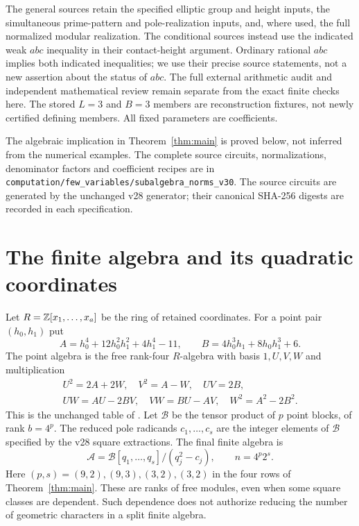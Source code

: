 \documentclass[11pt,a4paper]{article}
\theoremstyle{remark}\newtheorem{remark}[theorem]{Remark}
\begin{document}
The general sources retain the specified elliptic group and height inputs,
the simultaneous prime-pattern and pole-realization inputs, and, where
used, the full normalized modular realization. The conditional sources
instead use the indicated weak $abc$ inequality in their contact-height
argument. Ordinary rational $abc$ implies both indicated inequalities;
we use their precise source statements, not a new assertion about the
status of $abc$. The full external arithmetic audit and independent
mathematical review remain separate from the exact finite checks here.
The stored $L=3$ and $B=3$ members are reconstruction fixtures, not newly
certified defining members. All fixed parameters are coefficients.

The algebraic implication in Theorem~\ref{thm:main} is proved below, not
inferred from the numerical examples. The complete source circuits,
normalizations, denominator factors and coefficient recipes are in
\nolinkurl{computation/few_variables/subalgebra_norms_v30}. The source
circuits are generated by the unchanged v28 generator; their canonical
SHA-256 digests are recorded in each specification.

\section{The finite algebra and its quadratic coordinates}
Let $R=\mathbb Z[x_1,\ldots,x_a]$ be the ring of retained coordinates.
For a point pair $(h_0,h_1)$ put
\[
 A=h_0^4+12h_0^2h_1^2+4h_1^4-11,\qquad
 B=4h_0^3h_1+8h_0h_1^3+6.
\]
The point algebra is the free rank-four $R$-algebra with basis $1,U,V,W$
and multiplication
\begin{equation}\label{eq:point}
\begin{gathered}
 U^2=2A+2W,\quad V^2=A-W,\quad UV=2B,\\
 UW=AU-2BV,\quad VW=BU-AV,\quad W^2=A^2-2B^2.
\end{gathered}
\end{equation}
This is the unchanged table of \cite{UnitNorm}. Let $\mathcal B$ be the
tensor product of $p$ point blocks, of rank $b=4^p$. The reduced pole
radicands $c_1,\ldots,c_s$ are the integer elements of $\mathcal B$
specified by the v28 square extractions. The final finite algebra is
\[
 \mathcal A=\mathcal B[q_1,\ldots,q_s]/(q_j^2-c_j),\qquad n=4^p2^s.
\]
Here $(p,s)=(9,2),(9,3),(3,2),(3,2)$ in the four rows of
Theorem~\ref{thm:main}. These are ranks of free modules, even when some
square classes are dependent. Such dependence does not authorize
reducing the number of geometric characters in a split finite algebra.
\end{document}
